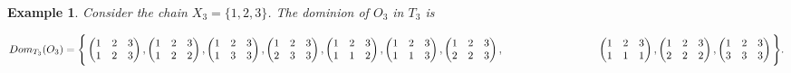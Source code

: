 \documentclass[10pt]{extarticle}
\numberwithin{equation}{section}
\numberwithin{bbb}{section}
\newtheorem{example}[theorem]{Example}
\numberwithin{equation}{section}
\begin{document}
\vspace{0.5cm}
\begin{example}
Consider the chain $X_3=\{1,2,3\}$. The dominion of $O_3$ in $T_3$ is 

\vspace{0.5cm}
$Dom_{T_3}(O_3)= \Bigg\{
   \begin{pmatrix}  1&2&3\\1&2&3
\end{pmatrix}, 
\begin{pmatrix}  1&2&3\\1&2&2
\end{pmatrix},
\begin{pmatrix}  1&2&3\\1&3&3
\end{pmatrix},
\begin{pmatrix}  1&2&3\\2&3&3
\end{pmatrix},
\begin{pmatrix}  1&2&3\\1&1&2
\end{pmatrix},
\begin{pmatrix}  1&2&3\\1&1&3
\end{pmatrix},
\begin{pmatrix}  1&2&3\\2&2&3
\end{pmatrix},\\
\vspace{0.1cm}
\hspace{3.1cm}
\begin{pmatrix}  1&2&3\\1&1&1
\end{pmatrix},
\begin{pmatrix}  1&2&3\\2&2&2
\end{pmatrix},
\begin{pmatrix}  1&2&3\\3&3&3
\end{pmatrix}
\Bigg\}.$
\end{example}


\end{document}
